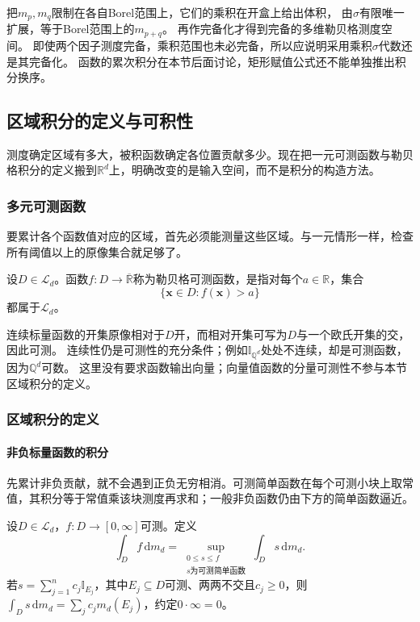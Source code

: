 把$m_p,m_q$限制在各自Borel范围上，它们的乘积在开盒上给出体积，
由$\sigma$有限唯一扩展，等于Borel范围上的$m_{p+q}$。
再作完备化才得到完备的多维勒贝格测度空间。
即使两个因子测度完备，乘积范围也未必完备，所以应说明采用乘积$\sigma$代数还是其完备化。
函数的累次积分在本节后面讨论，矩形赋值公式还不能单独推出积分换序。


\subsection{区域积分的定义与可积性}
\label{sec:multivariable-riemann-lebesgue}

测度确定区域有多大，被积函数确定各位置贡献多少。现在把一元可测函数与勒贝格积分的定义搬到$\mathbb R^d$上，明确改变的是输入空间，而不是积分的构造方法。

\subsubsection{多元可测函数}

要累计各个函数值对应的区域，首先必须能测量这些区域。与一元情形一样，检查所有阈值以上的原像集合就足够了。
\begin{definition}[多元可测函数]
设$D\in\mathcal L_d$。函数$f:D\to\overline{\mathbb R}$称为勒贝格可测函数，是指对每个$a\in\mathbb R$，集合
\[
 \{\bm x\in D:f(\bm x)>a\}
\]
都属于$\mathcal L_d$。
\end{definition}

连续标量函数的开集原像相对于$D$开，而相对开集可写为$D$与一个欧氏开集的交，因此可测。
连续性仍是可测性的充分条件；例如$\mathbb I_{\mathbb Q^d}$处处不连续，却是可测函数，因为$\mathbb Q^d$可数。
这里没有要求函数输出向量；向量值函数的分量可测性不参与本节区域积分的定义。

\subsubsection{区域积分的定义}

\paragraph{非负标量函数的积分}

先累计非负贡献，就不会遇到正负无穷相消。可测简单函数在每个可测小块上取常值，其积分等于常值乘该块测度再求和；一般非负函数仍由下方的简单函数逼近。
\begin{definition}[非负区域积分]
设$D\in\mathcal L_d$，$f:D\to[0,\infty]$可测。定义
\[
 \int_D f\,\mathrm dm_d
 =\sup_{\substack{0\leq s\leq f\\s\text{为可测简单函数}}}
 \int_D s\,\mathrm dm_d.
\]
若$s=\sum_{j=1}^n c_j\mathbb I_{E_j}$，其中$E_j\subseteq D$可测、两两不交且$c_j\geq0$，则$\int_Ds\,\mathrm dm_d=\sum_jc_jm_d(E_j)$，约定$0\cdot\infty=0$。
\end{definition}

